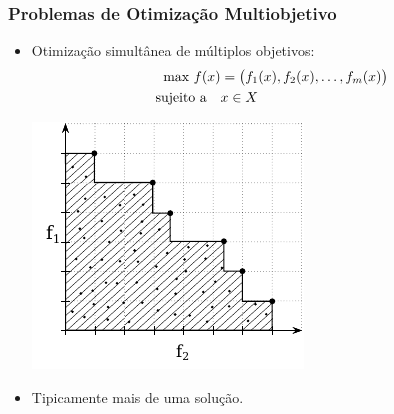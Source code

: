 \documentclass[10pt,xcolor=table,fleqn]{beamer}
\begin{document}
\begin{frame}
	\frametitle{Problemas de Otimização Multiobjetivo}
  \begin{itemize}
    \item{Otimização simultânea de múltiplos objetivos:
    \begin{align*}
      \text{max} ~ f(x) &=
        \big(f_1(x)
        ,f_2(x)
        ,\ldots
        ,f_{m}(x)\big) \\
      \text{sujeito a} \quad & x \in X
    \end{align*}
    \begin{center}
      \includegraphics[scale=0.8]{../img/mokp/pareto-def}
    \end{center}
    }
    \item{ Tipicamente mais de uma solução.}
  \end{itemize}
\end{frame}
\end{document}
